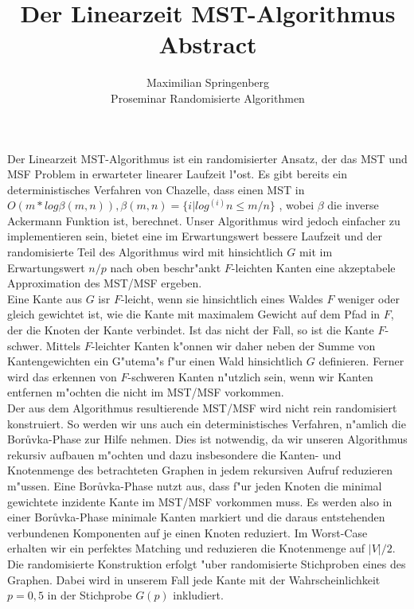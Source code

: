 \documentclass[a4paper,12pt,times,german]{cls/summary}
\title{Der Linearzeit MST-Algorithmus\\
       \LARGE Abstract}
\author{Maximilian Springenberg\\
        \small Proseminar Randomisierte Algorithmen}
\date{}
\begin{document}
\maketitle
Der Linearzeit MST-Algorithmus ist ein randomisierter Ansatz, der das MST und MSF
    Problem in erwarteter linearer Laufzeit l"ost.
    Es gibt bereits ein deterministisches Verfahren von Chazelle, dass einen MST in
    $O(m * log \beta(m,n)), \beta(m,n) = \{i | log^{(i)} n \leq m / n\}$
    , wobei $\beta$ die inverse Ackermann Funktion ist, berechnet.
    Unser Algorithmus wird jedoch einfacher zu implementieren sein, bietet eine
    im Erwartungswert bessere Laufzeit und der randomisierte Teil des 
    Algorithmus wird mit hinsichtlich $G$ mit im Erwartungswert $n/p$ nach oben
    beschr"ankt
    $F$-leichten Kanten eine akzeptabele Approximation des MST/MSF ergeben.\\
Eine Kante aus $G$ isr $F$-leicht, wenn sie hinsichtlich eines Waldes $F$ 
    weniger oder gleich
    gewichtet ist, wie die Kante mit maximalem Gewicht auf dem Pfad in $F$,
    der die Knoten der Kante verbindet. 
    Ist das nicht der Fall, so ist die Kante $F$-schwer.
    Mittels $F$-leichter Kanten k"onnen wir daher neben der Summe von Kantengewichten
    ein G"utema"s f"ur einen Wald hinsichtlich $G$ definieren.
    Ferner wird das erkennen von $F$-schweren Kanten n"utzlich sein, wenn wir
    Kanten entfernen m"ochten die nicht im MST/MSF vorkommen.\\
Der aus dem Algorithmus resultierende MST/MSF wird nicht rein randomisiert 
    konstruiert. 
    So werden wir uns auch ein deterministisches Verfahren, n"amlich die
    Bor\r uvka-Phase zur Hilfe nehmen.
    Dies ist notwendig, da wir unseren Algorithmus rekursiv
    aufbauen m"ochten und dazu insbesondere die Kanten- und Knotenmenge des
    betrachteten Graphen in jedem rekursiven Aufruf reduzieren m"ussen.
    Eine Bor\r uvka-Phase nutzt aus, dass f"ur jeden Knoten die minimal gewichtete
    inzidente Kante im MST/MSF vorkommen muss. 
    Es werden also in einer Bor\r uvka-Phase minimale Kanten markiert und die 
    daraus entstehenden verbundenen Komponenten auf je einen Knoten reduziert.
    Im Worst-Case erhalten wir ein perfektes Matching und reduzieren die 
    Knotenmenge auf $|V|/2$.\\
Die randomisierte Konstruktion erfolgt "uber randomisierte Stichproben eines
    des Graphen.
    Dabei wird in unserem Fall jede Kante mit der Wahrscheinlichkeit $p=0,5$
    in der Stichprobe $G(p)$ inkludiert. 
\end{document}
